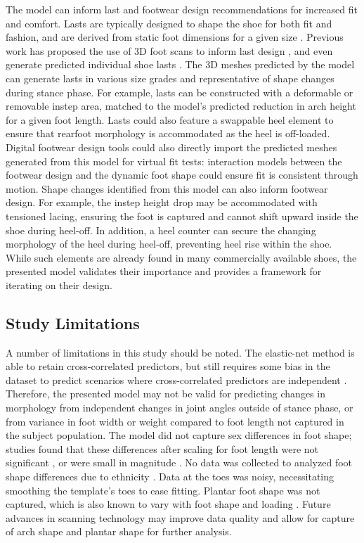 \documentclass[defaultstyle,11pt]{comps}
\begin{document}
The model can inform last and footwear design recommendations for increased fit and comfort.
Lasts are typically designed to shape the shoe for both fit and fashion, and are derived from static foot dimensions for a given size \citep{Luximon2013}.
Previous work has proposed the use of 3D foot scans to inform last design \citep{Sambhav2011}, and even generate predicted individual shoe lasts \citep{Amza2019}.
The 3D meshes predicted by the model can generate lasts in various size grades and representative of shape changes during stance phase.
For example, lasts can be constructed with a deformable or removable instep area, matched to the model's predicted reduction in arch height for a given foot length.
Lasts could also feature a swappable heel element to ensure that rearfoot morphology is accommodated as the heel is off-loaded.
Digital footwear design tools could also directly import the predicted meshes generated from this model for virtual fit tests: interaction models between the footwear design and the dynamic foot shape could ensure fit is consistent through motion.
Shape changes identified from this model can also inform footwear design.
For example, the instep height drop may be accommodated with tensioned lacing, ensuring the foot is captured and cannot shift upward inside the shoe during heel-off.
In addition, a heel counter can secure the changing morphology of the heel during heel-off, preventing heel rise within the shoe.
While such elements are already found in many commercially available shoes, the presented model validates their importance and provides a framework for iterating on their design.

\hypertarget{study-limitations}{%
\subsection{Study Limitations}\label{study-limitations}}

A number of limitations in this study should be noted.
The elastic-net method is able to retain cross-correlated predictors, but still requires some bias in the dataset to predict scenarios where cross-correlated predictors are independent \citep{Zou2005}.
Therefore, the presented model may not be valid for predicting changes in morphology from independent changes in joint angles outside of stance phase, or from variance in foot width or weight compared to foot length not captured in the subject population.
The model did not capture sex differences in foot shape; studies found that these differences after scaling for foot length were not significant \citep{Kouchi2009, Barisch-Fritz2014a, Conrad2019}, or were small in magnitude \citep{Wunderlich2001, Krauss2008}.
No data was collected to analyzed foot shape differences due to ethnicity \citep{Jurca2019}.
Data at the toes was noisy, necessitating smoothing the template's toes to ease fitting.
Plantar foot shape was not captured, which is also known to vary with foot shape and loading \citep{Mei2020}.
Future advances in scanning technology may improve data quality and allow for capture of arch shape and plantar shape for further analysis.
\end{document}
